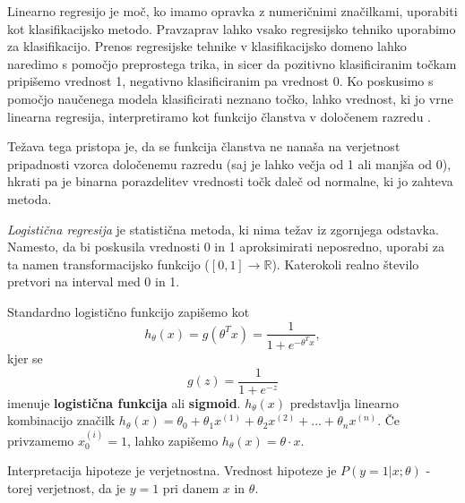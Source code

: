 \documentclass[11pt,a4paper,openany]{book}
\begin{document}
Linearno regresijo je moč, ko imamo opravka z numeričnimi značilkami, uporabiti kot klasifikacijsko metodo. Pravzaprav lahko vsako regresijsko tehniko uporabimo za klasifikacijo. Prenos regresijske tehnike v klasifikacijsko domeno lahko naredimo s pomočjo preprostega trika, in sicer da pozitivno klasificiranim točkam pripišemo vrednost 1, negativno klasificiranim pa vrednost 0. Ko poskusimo s pomočjo naučenega modela klasificirati neznano točko, lahko vrednost, ki jo vrne linearna regresija, interpretiramo kot funkcijo članstva v določenem razredu \cite{Witten2005}.

Težava tega pristopa je, da se funkcija članstva ne nanaša na verjetnost pripadnosti vzorca določenemu razredu (saj je lahko večja od 1 ali manjša od 0), hkrati pa je binarna porazdelitev vrednosti točk daleč od normalne, ki jo zahteva metoda.

\textit{Logistična regresija} je statistična metoda, ki nima težav iz zgornjega odstavka. Namesto, da bi poskusila vrednosti 0 in 1 aproksimirati neposredno, uporabi za ta namen transformacijsko funkcijo ($[0, 1] \rightarrow \mathbb{R}$). Katerokoli realno število pretvori na interval med 0 in 1.

Standardno logistično funkcijo zapišemo kot
\begin{equation}
	\label{en:standardna_log_funkcija}
	h_\theta(x) = g(\theta^Tx) = \frac{1}{1 + e^{-\theta^Tx}},
\end{equation}
kjer se
\begin{equation}
	g(z) = \frac{1}{1 + e^{-z}}
\end{equation}
imenuje \textbf{logistična funkcija} ali \textbf{sigmoid}. $h_\theta(x)$ predstavlja linearno kombinacijo značilk $h_\theta(x) = \theta_0 + \theta_1x^{(1)} + \theta_2x^{(2)} + \dots + \theta_nx^{(n)}$. Če privzamemo $x_0^{(i)} = 1$, lahko zapišemo $h_\theta(x) = \theta \cdot x$.

Interpretacija hipoteze je verjetnostna. Vrednost hipoteze je $P(y=1|x;\theta)$ - torej verjetnost, da je $y = 1$ pri danem $x$ in $\theta$.
\end{document}
